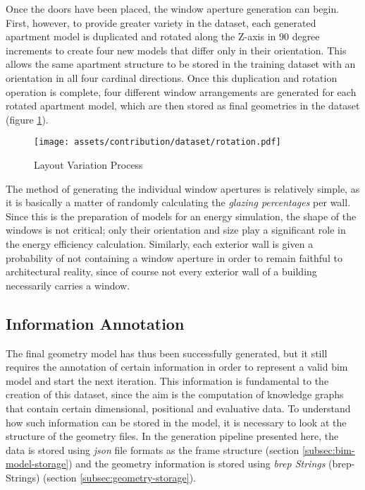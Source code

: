 \documentclass[a4paper, 12pt]{report}
\begin{document}
Once the doors have been placed, the window \gls{aperture} generation can begin. First, however, to provide greater variety in the dataset, each generated apartment model is duplicated and rotated along the Z-axis in 90 degree increments to create four new models that differ only in their orientation. This allows the same apartment structure to be stored in the training dataset with an orientation in all four cardinal directions. Once this duplication and rotation operation is complete, four different window arrangements are generated for each rotated apartment model, which are then stored as final geometries in the dataset (figure \ref{fig:layout-variants-diagram}).

\begin{figure}
\centering
\texttt{[image: assets/contribution/dataset/rotation.pdf]}
\caption{Layout Variation Process}
\label{fig:layout-variants-diagram}
\end{figure}

The method of generating the individual window \glspl{aperture} is relatively simple, as it is basically a matter of randomly calculating the \textit{\glspl{glazing percentage}} per wall. Since this is the preparation of models for an energy simulation, the shape of the windows is not critical; only their orientation and size play a significant role in the energy efficiency calculation. Similarly, each exterior wall is given a probability of not containing a window \gls{aperture} in order to remain faithful to architectural reality, since of course not every exterior wall of a building necessarily carries a window.

\subsection{Information Annotation}\label{subsec:information-annotation}

The final geometry model has thus been successfully generated, but it still requires the annotation of certain information in order to represent a valid \acrshort{bim} model and start the next iteration. This information is fundamental to the creation of this dataset, since the aim is the computation of \glspl{knowledge graph} that contain certain dimensional, positional and evaluative data. To understand how such information can be stored in the model, it is necessary to look at the structure of the geometry files. In the generation pipeline presented here, the data is stored using \textit{\acrfull{json}} file formats as the frame structure (section \ref{subsec:bim-model-storage}) and the geometry information is stored using \textit{\acrlong{brep} Strings} (\acrshort{brep}-Strings) (section \ref{subsec:geometry-storage}).
\end{document}
